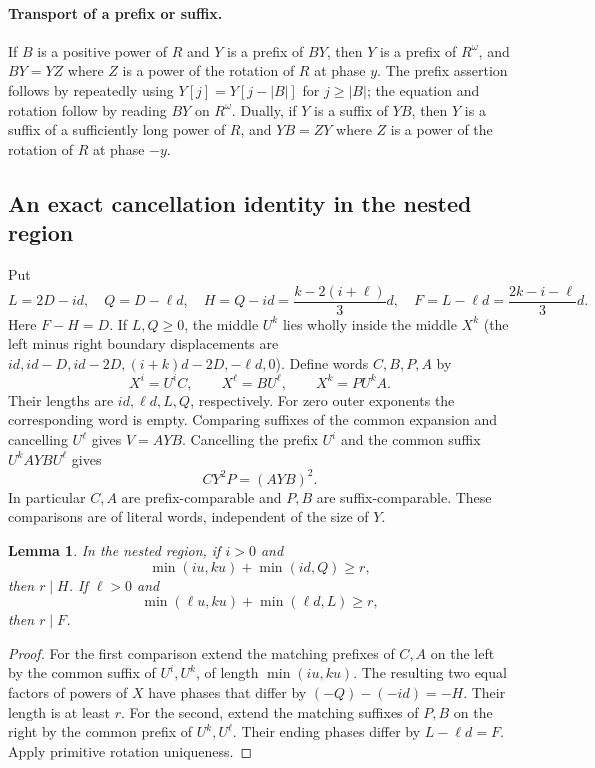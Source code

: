 \documentclass[11pt]{article}
\newtheorem{lemma}[theorem]{Lemma}
\theoremstyle{remark}\newtheorem*{remark}{Remark}
\begin{document}
\paragraph{Transport of a prefix or suffix.}
If $B$ is a positive power of $R$ and $Y$ is a prefix of $BY$, then $Y$
is a prefix of $R^\omega$, and $BY=YZ$ where $Z$ is a power of the
rotation of $R$ at phase $y$. The prefix assertion follows by repeatedly
using $Y[j]=Y[j-|B|]$ for $j\ge |B|$; the equation and rotation follow
by reading $BY$ on $R^\omega$. Dually, if $Y$ is a suffix of $YB$,
then $Y$ is a suffix of a sufficiently long power of $R$, and $YB=ZY$
where $Z$ is a power of the rotation of $R$ at phase $-y$.

\subsection{An exact cancellation identity in the nested region}
Put
\[
 L=2D-id,\quad Q=D-\ell d,\quad
 H=Q-id=\frac{k-2(i+\ell)}3d,\quad
 F=L-\ell d=\frac{2k-i-\ell}3d.
\]
Here $F-H=D$. If $L,Q\ge0$, the middle $U^k$ lies wholly inside the
middle $X^k$ (the left minus right boundary displacements are
$id,id-D,id-2D,(i+k)d-2D,-\ell d,0$). Define words $C,B,P,A$ by
\begin{equation}\label{ph:factor}
 X^i=U^i C,\qquad X^\ell=B U^\ell,\qquad
 X^k=P U^k A.
\end{equation}
Their lengths are $id,\ell d,L,Q$, respectively. For zero outer
exponents the corresponding word is empty. Comparing suffixes of the
common expansion and cancelling $U^\ell$ gives $V=AYB$. Cancelling the
prefix $U^i$ and the common suffix $U^k AYB U^\ell$ gives
\begin{equation}\label{ph:cancel}
 C Y^2 P=(A Y B)^2.
\end{equation}
In particular $C,A$ are prefix-comparable and $P,B$ are suffix-comparable.
These comparisons are of literal words, independent of the size of $Y$.

\begin{lemma}\label{ph:phase}
In the nested region, if $i>0$ and
\[
 \min(iu,ku)+\min(id,Q)\ge r,
\]
then $r\mid H$. If $\ell>0$ and
\[
 \min(\ell u,ku)+\min(\ell d,L)\ge r,
\]
then $r\mid F$.
\end{lemma}
\begin{proof}
For the first comparison extend the matching prefixes of $C,A$ on
the left by the common suffix of $U^i,U^k$, of length $\min(iu,ku)$.
The resulting two equal factors of powers of $X$ have phases that
differ by $(-Q)-(-id)=-H$. Their length is at least $r$. For the
second, extend the matching suffixes of $P,B$ on the right by the
common prefix of $U^k,U^\ell$. Their ending phases differ by $L-\ell
d=F$. Apply primitive rotation uniqueness.
\end{proof}
\end{document}
